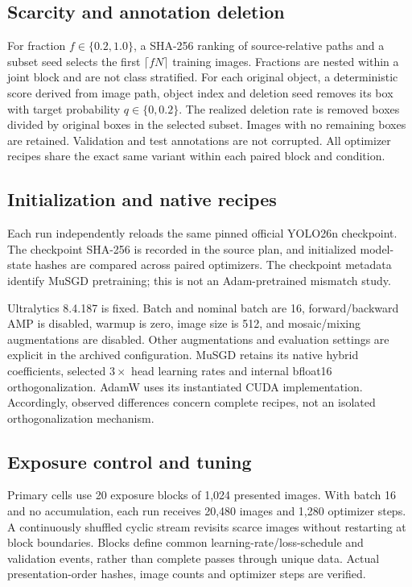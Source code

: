 \documentclass[11pt,a4paper]{article}
\begin{document}
\subsection{Scarcity and annotation deletion}
For fraction $f\in\{0.2,1.0\}$, a SHA-256 ranking of source-relative paths and a subset seed selects the first $\lceil fN\rceil$ training images. Fractions are nested within a joint block and are not class stratified. For each original object, a deterministic score derived from image path, object index and deletion seed removes its box with target probability $q\in\{0,0.2\}$. The realized deletion rate is removed boxes divided by original boxes in the selected subset. Images with no remaining boxes are retained. Validation and test annotations are not corrupted. All optimizer recipes share the exact same variant within each paired block and condition.

\subsection{Initialization and native recipes}
Each run independently reloads the same pinned official YOLO26n checkpoint. The checkpoint SHA-256 is recorded in the source plan, and initialized model-state hashes are compared across paired optimizers. The checkpoint metadata identify MuSGD pretraining; this is not an Adam-pretrained mismatch study.

Ultralytics 8.4.187 is fixed. Batch and nominal batch are 16, forward/backward AMP is disabled, warmup is zero, image size is 512, and mosaic/mixing augmentations are disabled. Other augmentations and evaluation settings are explicit in the archived configuration. MuSGD retains its native hybrid coefficients, selected $3\times$ head learning rates and internal bfloat16 orthogonalization. AdamW uses its instantiated CUDA implementation. Accordingly, observed differences concern complete recipes, not an isolated orthogonalization mechanism.

\subsection{Exposure control and tuning}
Primary cells use 20 exposure blocks of 1,024 presented images. With batch 16 and no accumulation, each run receives 20,480 images and 1,280 optimizer steps. A continuously shuffled cyclic stream revisits scarce images without restarting at block boundaries. Blocks define common learning-rate/loss-schedule and validation events, rather than complete passes through unique data. Actual presentation-order hashes, image counts and optimizer steps are verified.
\end{document}
